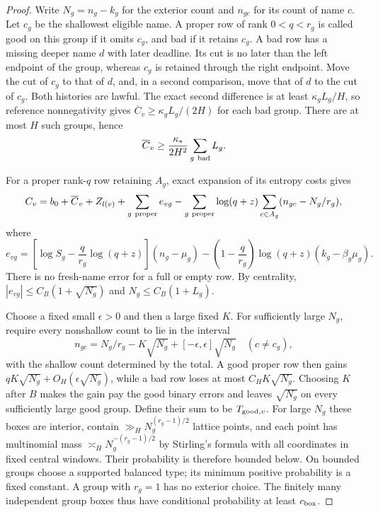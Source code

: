 \begin{proof}
Write $N_g=n_g-k_g$ for the exterior count and $n_{gc}$ for its count
of name $c$.  Let $c_g$ be the shallowest eligible name.  A proper
row of rank $0<q<r_g$ is called good on this group if it omits $c_g$,
and bad if it retains $c_g$.
A bad row has a missing deeper name $d$ with later deadline.  Its
cut is no later than the left endpoint of the group, whereas $c_g$
is retained through the right endpoint.  Move the cut of $c_g$ to
that of $d$, and, in a second comparison, move that of $d$ to the
cut of $c_g$.  Both histories are lawful.  The exact second difference
is at least $\kappa_gL_g/H$, so reference nonnegativity gives
$\overline C_v\geq\kappa_gL_g/(2H)$ for each bad group.
There are at most $H$ such groups, hence
\begin{equation}\label{paper:ep-bad-budget}
 \overline C_v\geq\frac{\kappa_*}{2H^2}
                           \sum_{g\ {\rm bad}}L_g.
\end{equation}

For a proper rank-$q$ row retaining $A_g$, exact expansion of its
entropy costs gives
\begin{equation}\label{paper:ep-row-expansion}
 C_v=b_0+\overline C_v+Z_{l(v)}
      +\sum_{g\ {\rm proper}}e_{vg}
      -\sum_{g\ {\rm proper}}\log(q+z)
                 \sum_{c\in A_g}(n_{gc}-N_g/r_g),
\end{equation}
where
\[
 e_{vg}=\left[\log S_g-\frac q{r_g}\log(q+z)\right](n_g-\mu_g)
       -\left(1-\frac q{r_g}\right)\log(q+z)(k_g-\beta_g\mu_g).
\]
There is no fresh-name error for a full or empty row.
By centrality, $|e_{vg}|\leq C_B(1+\sqrt{N_g})$ and
$N_g\leq C_B(1+L_g)$.

Choose a fixed small $\epsilon>0$ and then a large fixed $K$.
For sufficiently large $N_g$, require every nonshallow count to lie
in the interval
\begin{equation}\label{paper:ep-displaced-type}
 n_{gc}=N_g/r_g-K\sqrt{N_g}+[-\epsilon,\epsilon]\sqrt{N_g}
 \quad(c\ne c_g),
\end{equation}
with the shallow count determined by the total.  A good proper row
then gains $qK\sqrt{N_g}+O_H(\epsilon\sqrt{N_g})$, while a bad
row loses at most $C_HK\sqrt{N_g}$.  Choosing $K$ after $B$ makes
the gain pay the good binary errors and leaves $\sqrt{N_g}$ on
every sufficiently large good group.  Define their sum to be
$T_{{\rm good},v}$.
For large $N_g$ these boxes are interior, contain
$\gg_HN_g^{(r_g-1)/2}$ lattice points, and each point has multinomial
mass $\asymp_HN_g^{-(r_g-1)/2}$ by Stirling's formula with all
coordinates in fixed central windows.  Their probability is therefore
bounded below.  On bounded groups choose a supported balanced type;
its minimum positive probability is a fixed constant.  A group with
$r_g=1$ has no exterior choice.  The finitely many independent group
boxes thus have conditional probability at least $c_{\rm box}$.


\end{proof}

